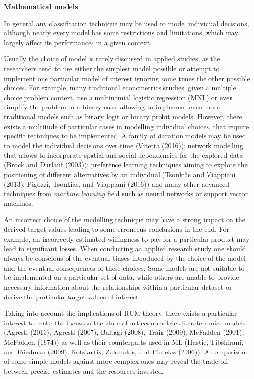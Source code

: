\documentclass[12pt,]{article}
\begin{document}
\textbf{Mathematical models}

In general any classification technique may be used to model individual
decisions, although nearly every model has some restrictions and
limitations, which may largely affect its performances in a given
context.

Usually the choice of model is rarely discussed in applied studies, as
the researchers tend to use either the simplest model possible or
attempt to implement one particular model of interest ignoring some
times the other possible choices. For example, many traditional
econometrics studies, given a multiple choice problem context, use a
multinomial logistic regression (MNL) or even simplify the problem to a
binary case, allowing to implement even more traditional models such as
binary logit or binary probit models. However, there exists a multitude
of particular cases in modelling individual choices, that require
specific techniques to be implemented. A family of duration models may
be used to model the individual decisions over time (Vitetta (2016));
network modelling that allows to incorporate spatial and social
dependencies for the explored data (Brock and Durlauf (2003));
preference learning techniques aiming to explore the positioning of
different alternatives by an individual (Tsoukiàs and Viappiani (2013),
Pigozzi, Tsoukiàs, and Viappiani (2016)) and many other advanced
techniques from \emph{machine learning} field such as neural networks or
support vector machines.

An incorrect choice of the modelling technique may have a strong impact
on the derived target values leading to some erroneous conclusions in
the end. For example, an incorrectly estimated willingness to pay for a
particular product may lead to significant losses. When conducting an
applied research study one should always be conscious of the eventual
biases introduced by the choice of the model and the eventual
consequences of these choices. Some models are not suitable to be
implemented on a particular set of data, while others are unable to
provide necessary information about the relationships within a
particular dataset or derive the particular target values of interest.

Taking into account the implications of RUM theory, there exists a
particular interest to make the focus on the state of art econometric
discrete choice models (Agresti (2013), Agresti (2007), Baltagi (2008),
Train (2009), McFadden (2001), McFadden (1974)) as well as their
counterparts used in ML (Hastie, Tibshirani, and Friedman (2009),
Kotsiantis, Zaharakis, and Pintelas (2006)). A comparison of some simple
models against more complex ones may reveal the trade-off between
precise estimates and the resources invested.
\end{document}
